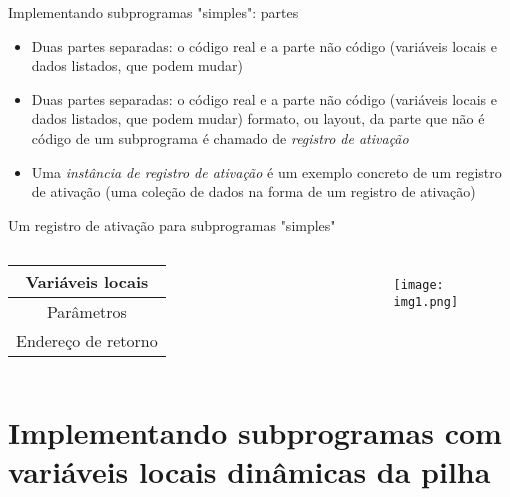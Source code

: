 \documentclass[10pt]{beamer}
\begin{document}
{
\begin{frame}{Implementando subprogramas "simples": partes}
	\begin{itemize}
    	\item Duas partes separadas: o código real e a parte não código (variáveis locais e dados listados, que podem mudar)
    	\item Duas partes separadas: o código real e a parte não código (variáveis locais e dados listados, que podem mudar)
    	\itemO formato, ou layout, da parte que não é código de um subprograma é chamado de \textit{registro de ativação}
    	\item Uma \textit{instância de registro de ativação} é um exemplo concreto de um registro de ativação (uma coleção de dados na forma de um registro de ativação)
    \end{itemize}
\end{frame}
}

{

\begin{frame}{Um registro de ativação para subprogramas "simples"}
\begin{columns}[T,onlytextwidth]
	\begin{table}[]
        \begin{tabular}{ | c | }\hline
            Variáveis locais    \\ \hline
            Parâmetros          \\ \hline
            Endereço de retorno \\ \hline
        \end{tabular}
    \end{table}
    \begin{figure}
      \texttt{[image: img1.png]}
    \end{figure}
\end{columns}
\end{frame}
}

\section{Implementando subprogramas com variáveis locais dinâmicas da pilha}
\end{document}
